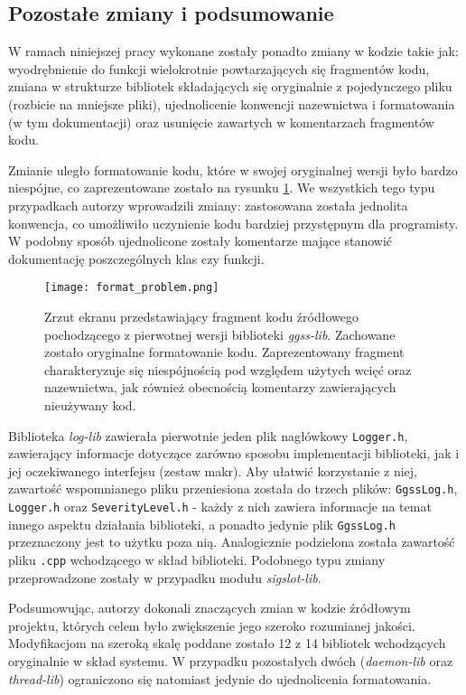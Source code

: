 \subsection{Pozostałe zmiany i podsumowanie}
W ramach niniejszej pracy wykonane zostały ponadto zmiany w kodzie takie jak: wyodrębnienie do funkcji wielokrotnie powtarzających się fragmentów kodu, zmiana w strukturze bibliotek składających się oryginalnie z pojedynczego pliku (rozbicie na mniejsze pliki), ujednolicenie konwencji nazewnictwa i formatowania (w tym dokumentacji) oraz usunięcie zawartych w komentarzach fragmentów kodu.

Zmianie uległo formatowanie kodu, które w swojej oryginalnej wersji było bardzo niespójne, co zaprezentowane zostało na rysunku \ref{fig:format_problem}. We wszystkich tego typu przypadkach autorzy wprowadzili zmiany: zastosowana została jednolita konwencja, co umożliwiło uczynienie kodu bardziej przystępnym dla programisty. W podobny sposób ujednolicone zostały komentarze mające stanowić dokumentację poszczególnych klas czy funkcji.

\begin{figure}[H]
\centering
\texttt{[image: format\_problem.png]}
\caption{Zrzut ekranu przedstawiający fragment kodu źródłowego pochodzącego z pierwotnej wersji biblioteki \emph{ggss-lib}. Zachowane zostało oryginalne formatowanie kodu. Zaprezentowany fragment charakteryzuje się niespójnością pod względem użytych wcięć oraz nazewnictwa, jak również obecnością komentarzy zawierających nieużywany kod.}
\label{fig:format_problem}
\end{figure}

Biblioteka \emph{log-lib} zawierała pierwotnie jeden plik nagłówkowy \lstinline{Logger.h}, zawierający informacje dotyczące zarówno sposobu implementacji biblioteki, jak i jej oczekiwanego interfejsu (zestaw makr). Aby ułatwić korzystanie z niej, zawartość wspomnianego pliku przeniesiona została do trzech plików: \lstinline{GgssLog.h}, \lstinline{Logger.h} oraz \lstinline{SeverityLevel.h} - każdy z nich zawiera informacje na temat innego aspektu działania biblioteki, a ponadto jedynie plik \lstinline{GgssLog.h} przeznaczony jest to użytku poza nią. Analogicznie podzielona została zawartość pliku \lstinline{.cpp} wchodzącego w skład biblioteki. Podobnego typu zmiany przeprowadzone zostały w przypadku modułu \emph{sigslot-lib}.

Podsumowując, autorzy dokonali znaczących zmian w kodzie źródłowym projektu, których celem było zwiększenie jego szeroko rozumianej jakości. Modyfikacjom na szeroką skalę poddane zostało 12 z 14 bibliotek wchodzących oryginalnie w skład systemu. W przypadku pozostałych dwóch (\emph{daemon-lib} oraz \emph{thread-lib}) ograniczono się natomiast jedynie do ujednolicenia formatowania.

